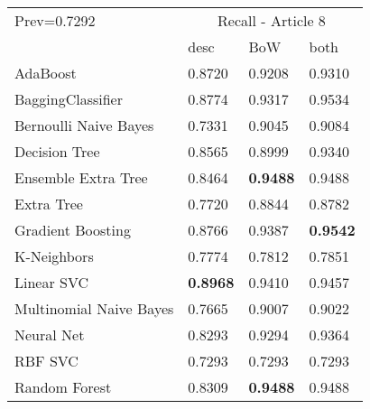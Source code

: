 \begin{tabular}{|l|l|l|l| }
\hline
Prev=0.7292 &  \multicolumn{3}{c|}{Recall - Article 8} \\
\cline{2-4} & desc & BoW & both \\ \hline
AdaBoost                & 0.8720 & 0.9208 & 0.9310\\
BaggingClassifier       & 0.8774 & 0.9317 & 0.9534\\
Bernoulli Naive Bayes   & 0.7331 & 0.9045 & 0.9084\\
Decision Tree           & 0.8565 & 0.8999 & 0.9340\\
Ensemble Extra Tree     & 0.8464 & {\bf 0.9488} & 0.9488\\
Extra Tree              & 0.7720 & 0.8844 & 0.8782\\
Gradient Boosting       & 0.8766 & 0.9387 & {\bf 0.9542}\\
K-Neighbors             & 0.7774 & 0.7812 & 0.7851\\
Linear SVC              & {\bf 0.8968} & 0.9410 & 0.9457\\
Multinomial Naive Bayes & 0.7665 & 0.9007 & 0.9022\\
Neural Net              & 0.8293 & 0.9294 & 0.9364\\
RBF SVC                 & 0.7293 & 0.7293 & 0.7293\\
Random Forest           & 0.8309 & {\bf 0.9488} & 0.9488\\
\hline
\end{tabular}